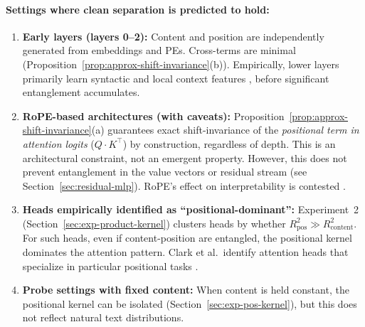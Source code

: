\documentclass[11pt]{article}
\theoremstyle{definition}
\begin{document}
\paragraph{Settings where clean separation is predicted to hold:}
\begin{enumerate}
    \item \textbf{Early layers (layers 0--2):} Content and position are independently generated from embeddings and PEs. Cross-terms are minimal (Proposition~\ref{prop:approx-shift-invariance}(b)). Empirically, lower layers primarily learn syntactic and local context features \cite{clark2019analyzing,tenney2019bert,jawahar2019bert}, before significant entanglement accumulates.
    \item \textbf{RoPE-based architectures (with caveats):} Proposition~\ref{prop:approx-shift-invariance}(a) guarantees exact shift-invariance of the \emph{positional term in attention logits} ($Q \cdot K^{\top}$) by construction, regardless of depth. This is an architectural constraint, not an emergent property. However, this does not prevent entanglement in the value vectors or residual stream (see Section~\ref{sec:residual-mlp}). RoPE's effect on interpretability is contested \cite{su2021roformer,peng2024rope,unpacking2025spectral}.
    \item \textbf{Heads empirically identified as ``positional-dominant'':} Experiment~2 (Section~\ref{sec:exp-product-kernel}) clusters heads by whether $R^2_{\text{pos}} \gg R^2_{\text{content}}$. For such heads, even if content-position are entangled, the positional kernel dominates the attention pattern. Clark et al.\ identify attention heads that specialize in particular positional tasks \cite{clark2019analyzing}.
    \item \textbf{Probe settings with fixed content:} When content is held constant, the positional kernel can be isolated (Section~\ref{sec:exp-pos-kernel}), but this does not reflect natural text distributions.
\end{enumerate}
\end{document}
